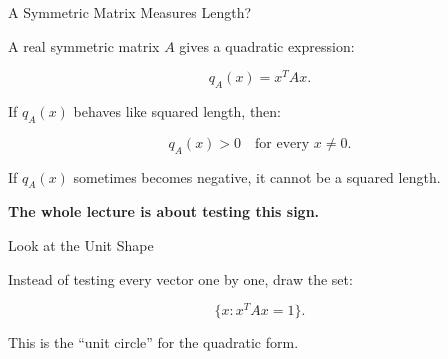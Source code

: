 \documentclass[10pt]{beamer}
\theoremstyle{definition}
\newcommand{\x}[1]{\alert{\textbf{#1}}}
\begin{document}
\begin{frame}{A Symmetric Matrix Measures Length?}

A real symmetric matrix $A$ gives a quadratic expression:

$$
q_A(x)=x^TAx.
$$

\vfill

If $q_A(x)$ behaves like squared length, then:

$$
q_A(x)>0\quad\text{for every }x\ne0.
$$

\vfill

If $q_A(x)$ sometimes becomes negative, it cannot be a squared length.

\vfill

\begin{center}
\x{The whole lecture is about testing this sign.}
\end{center}

\end{frame}


\begin{frame}{Look at the Unit Shape}

Instead of testing every vector one by one, draw the set:

$$
\{x:x^TAx=1\}.
$$

\vfill

This is the ``unit circle'' for the quadratic form.

\vfill

\begin{center}
\end{center}

\end{frame}
\end{document}
